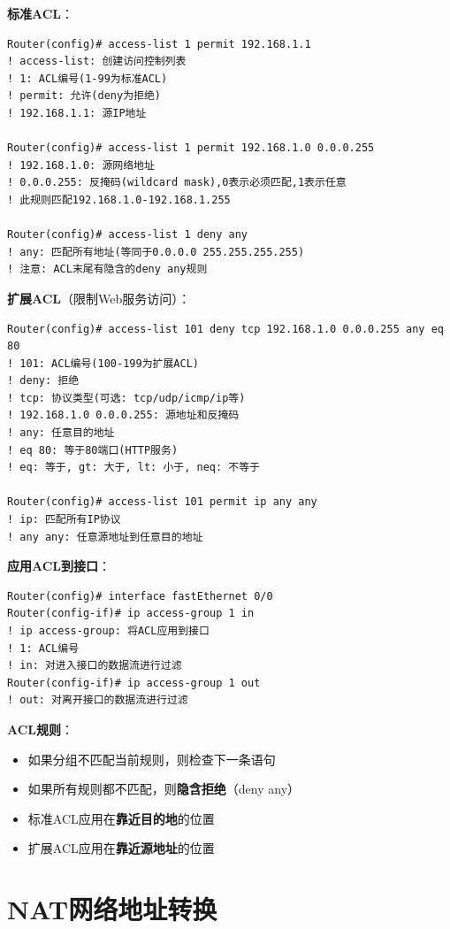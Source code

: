 \documentclass[12pt,a4paper]{ctexart}
\begin{document}
\begin{cmdbox}
\textbf{标准ACL}：
\begin{lstlisting}
Router(config)# access-list 1 permit 192.168.1.1
! access-list: 创建访问控制列表
! 1: ACL编号(1-99为标准ACL)
! permit: 允许(deny为拒绝)
! 192.168.1.1: 源IP地址

Router(config)# access-list 1 permit 192.168.1.0 0.0.0.255
! 192.168.1.0: 源网络地址
! 0.0.0.255: 反掩码(wildcard mask),0表示必须匹配,1表示任意
! 此规则匹配192.168.1.0-192.168.1.255

Router(config)# access-list 1 deny any
! any: 匹配所有地址(等同于0.0.0.0 255.255.255.255)
! 注意: ACL末尾有隐含的deny any规则
\end{lstlisting}

\textbf{扩展ACL}（限制Web服务访问）：
\begin{lstlisting}
Router(config)# access-list 101 deny tcp 192.168.1.0 0.0.0.255 any eq 80
! 101: ACL编号(100-199为扩展ACL)
! deny: 拒绝
! tcp: 协议类型(可选: tcp/udp/icmp/ip等)
! 192.168.1.0 0.0.0.255: 源地址和反掩码
! any: 任意目的地址
! eq 80: 等于80端口(HTTP服务)
! eq: 等于, gt: 大于, lt: 小于, neq: 不等于

Router(config)# access-list 101 permit ip any any
! ip: 匹配所有IP协议
! any any: 任意源地址到任意目的地址
\end{lstlisting}

\textbf{应用ACL到接口}：
\begin{lstlisting}
Router(config)# interface fastEthernet 0/0
Router(config-if)# ip access-group 1 in
! ip access-group: 将ACL应用到接口
! 1: ACL编号
! in: 对进入接口的数据流进行过滤
Router(config-if)# ip access-group 1 out
! out: 对离开接口的数据流进行过滤
\end{lstlisting}
\end{cmdbox}

\begin{keybox}
\textbf{ACL规则}：
\begin{itemize}[itemsep=0pt]
    \item 如果分组不匹配当前规则，则检查下一条语句
    \item 如果所有规则都不匹配，则\textbf{隐含拒绝}（deny any）
    \item 标准ACL应用在\textbf{靠近目的地}的位置
    \item 扩展ACL应用在\textbf{靠近源地址}的位置
\end{itemize}
\end{keybox}

\section{NAT网络地址转换}
\end{document}
